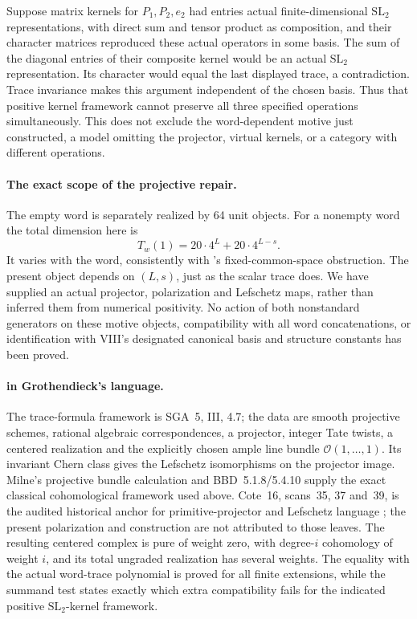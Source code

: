 Suppose matrix kernels for $P_1,P_2,e_2$ had entries actual
finite-dimensional $\mathrm{SL}_2$ representations, with direct
sum and tensor product as composition, and their character
matrices reproduced these actual operators in some basis.
The sum of the diagonal entries of their composite kernel would
be an actual $\mathrm{SL}_2$ representation. Its character would
equal the last displayed trace, a contradiction. Trace invariance
makes this argument independent of the chosen basis.
Thus that positive kernel framework cannot preserve all three
specified operations simultaneously. This does not exclude the
word-dependent motive just constructed, a model omitting the
projector, virtual kernels, or a category with different operations.

\paragraph{The exact scope of the projective repair.}
The empty word is separately realized by 64 unit objects.
For a nonempty word the total dimension here is
\[
 T_w(1)=20\cdot4^L+20\cdot4^{L-s}.
\]
It varies with the word, consistently with 's
fixed-common-space obstruction. The present object depends on
$(L,s)$, just as the scalar trace does. We have supplied an actual
projector, polarization and Lefschetz maps, rather than inferred
them from numerical positivity. No action of both nonstandard
generators on these motive objects, compatibility with all word
concatenations, or identification with VIII's designated canonical
basis and structure constants has been proved.

\paragraph{ in Grothendieck's language.}
The trace-formula framework is SGA~5, III, 4.7; the data
are smooth projective schemes, rational algebraic
correspondences, a projector, integer Tate twists, a centered
realization and the explicitly chosen ample line bundle
$\mathcal O(1,\ldots,1)$. Its invariant Chern class gives the
Lefschetz isomorphisms on the projector image. Milne's projective
bundle calculation and BBD~5.1.8/5.4.10 supply the exact classical
cohomological framework used above. Cote~16, scans~35, 37 and~39,
is the audited historical anchor for primitive-projector and
Lefschetz language \cite{Archive}; the present polarization and
construction are not attributed to those leaves.
The resulting centered complex is pure of weight zero, with
degree-$i$ cohomology of weight $i$, and its total ungraded
realization has several weights. The equality with the actual
word-trace polynomial is proved for all finite extensions, while
the summand test states exactly which extra compatibility fails
for the indicated positive $\mathrm{SL}_2$-kernel framework.
